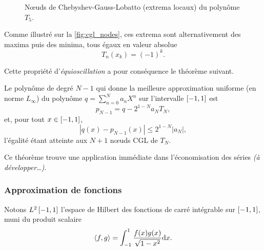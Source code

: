 \begin{figure}
	\centering
	
	\caption{N\oe uds de Chebyshev-Gauss-Lobatto (extrema locaux) du polynôme $T_5$.}%
	\label{fig:cgl_nodes}
\end{figure}

Comme illustré sur la \autoref{fig:cgl_nodes}, ces extrema sont alternativement des maxima puis des minima, tous égaux en valeur absolue
\begin{equation}
	T_n(x_k) = (-1)^{k}.
	\label{eq:chebyshev_equioscillation}
\end{equation}

Cette propriété d'\emph{équioscillation} a pour conséquence le théorème suivant.
\begin{theoreme}
	Le polynôme %
	de degré $N-1$ qui donne la meilleure approximation uniforme (\ie en norme $L_\infty$) %
du polynôme %
$q = \sum_{n=0}^{N} a_n X^n$ 
sur l'intervalle $\left[ -1, 1 \right]$ est
	\begin{equation}
		p_{N-1} = q - 2^{1-N} a_N T_N,
	\end{equation}
	et, pour tout $x \in \left[ -1, 1 \right]$,
	\begin{equation}
		\left| q(x)-  p_{N-1}(x)\right| \leq 2^{1-N} \left| a_N \right|,
	\end{equation}
	l'égalité étant atteinte aux $N+1$ n\oe uds CGL de $T_N$.
\end{theoreme}
Ce théorème trouve une application immédiate dans l'économisation des séries \textit{(à développer\ldots)}.


\subsubsection{Approximation de fonctions}
Notons $L^2\left[ -1, 1 \right]$ l'espace de Hilbert des fonctions de carré intégrable sur $\left[ -1, 1 \right]$, muni du produit scalaire
\begin{equation}
	\left \langle {f}, {g} \right \rangle =
	\int_{-1}^{1} \frac{f(x) g(x)}{\sqrt{1 - x^2}} \mathrm{d}{x} .
	\label{eq:chebyshev_scalar_product}
\end{equation}

